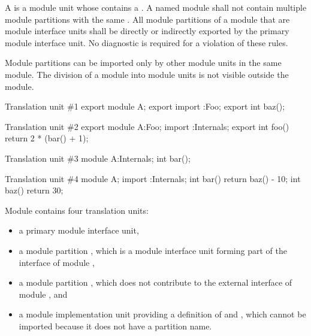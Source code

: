 \pnum
A  is
a module unit whose  contains
a .
A named module shall not contain multiple module partitions with
the same .
All module partitions of a module
that are module interface units
shall be directly or indirectly exported
by the primary module interface unit.
No diagnostic is required for a violation of these rules.
\begin{note}
Module partitions can be imported only by
other module units in the same module.
The division of a module into module units
is not visible outside the module.
\end{note}

\pnum
\begin{example}
\begin{codeblocktu}{Translation unit \#1}
export module A;
export import :Foo;
export int baz();
\end{codeblocktu}

\begin{codeblocktu}{Translation unit \#2}
export module A:Foo;
import :Internals;
export int foo() { return 2 * (bar() + 1); }
\end{codeblocktu}

\begin{codeblocktu}{Translation unit \#3}
module A:Internals;
int bar();
\end{codeblocktu}

\begin{codeblocktu}{Translation unit \#4}
module A;
import :Internals;
int bar() { return baz() - 10; }
int baz() { return 30; }
\end{codeblocktu}

Module  contains four translation units:
\begin{itemize}
\item a primary module interface unit,
\item a module partition , which is a module interface unit
forming part of the interface of module ,
\item a module partition , which does not contribute
to the external interface of module , and
\item a module implementation unit providing
a definition of  and ,
which cannot be imported because
it does not have a partition name.
\end{itemize}
\end{example}

